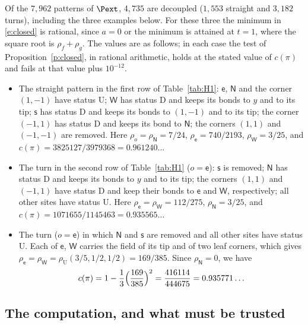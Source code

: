 Of the $7{,}962$ patterns of $\Pext$, $4{,}735$ are decoupled ($1{,}553$ straight and $3{,}182$ turns), including the three examples below. For these three the minimum in \eqref{e:closed} is rational, since $a = 0$ or the minimum is attained at $t = 1$, where the square root is $\rho_f + \rho_g$. The values are as follows; in each case the test of Proposition~\ref{p:closed}, in rational arithmetic, holds at the stated value of $c(\pi)$ and fails at that value plus $10^{-12}$.
\begin{itemize}
\item The straight pattern in the first row of Table~\ref{tab:H1}: $\mathsf e$, $\mathsf N$ and the corner $(1, -1)$ have status $\mathrm U$; $\mathsf W$ has status $\mathrm D$ and keeps its bonds to $y$ and to its tip; $\mathsf s$ has status $\mathrm D$ and keeps its bonds to $(1, -1)$ and to its tip; the corner $(-1, 1)$ has status $\mathrm D$ and keeps its bond to $\mathsf N$; the corners $(1, 1)$ and $(-1, -1)$ are removed. Here $\rho_o = \rho_{\mathsf N} = 7/24$, $\rho_{\mathsf e} = 740/2193$, $\rho_{\mathsf W} = 3/25$, and $c(\pi) = 3825127/3979368 = 0.961240\ldots$
\item The turn in the second row of Table~\ref{tab:H1} ($o = \mathsf e$): $\mathsf s$ is removed; $\mathsf N$ has status $\mathrm D$ and keeps its bonds to $y$ and to its tip; the corners $(1, 1)$ and $(-1, 1)$ have status $\mathrm D$ and keep their bonds to $\mathsf e$ and $\mathsf W$, respectively; all other sites have status $\mathrm U$. Here $\rho_{\mathsf e} = \rho_{\mathsf W} = 112/275$, $\rho_{\mathsf N} = 3/25$, and $c(\pi) = 1071655/1145463 = 0.935565\ldots$
\item The turn ($o = \mathsf e$) in which $\mathsf N$ and $\mathsf s$ are removed and all other sites have status $\mathrm U$. Each of $\mathsf e$, $\mathsf W$ carries the field of its tip and of two leaf corners, which gives $\rho_{\mathsf e} = \rho_{\mathsf W} = \rho_{\mathrm U}(3/5, 1/2, 1/2) = 169/385$. Since $\rho_{\mathsf N} = 0$, we have
\begin{equation}\label{e:5469}
c(\pi) = 1 - \frac13 \Bigl( \frac{169}{385} \Bigr)^2 = \frac{416114}{444675} = 0.935771\ldots
\end{equation}
\end{itemize}

\subsection{The computation, and what must be trusted}\label{s:localcomp}

